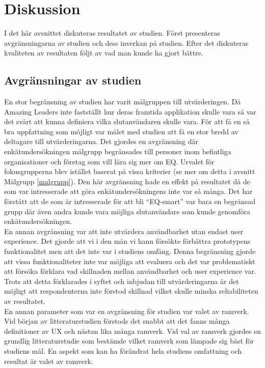 \section{Diskussion}
\label{sec:discussion}
I det här avsnittet diskuteras resultatet av studien. Först presenteras avgränsningarna av studien och dess inverkan på studien. Efter det diskuteras kvaliteten av resultaten följt av vad man kunde ha gjort bättre. 

\subsection{Avgränsningar av studien}
En stor begränsning av studien har varit målgruppen till utvärderingen. Då Amazing Leaders inte fastställt hur deras framtida applikation skulle vara så var det svårt att kunna definiera vilka slutanvändaren skulle vara. För att få en så bra uppfattning som möjligt var målet med studien att få en stor bredd av deltagare till utvärderingarna. Det gjordes en avgränsning där enkätundersökningen målgrupp begränsades till personer inom befintliga organisationer och företag som vill lära sig mer om EQ. Urvalet för fokusgrupperna blev istället baserat på vissa kriterier (se mer om detta i avsnitt Målgrupp \ref{malgrupp}). Den här avgränsning hade en effekt på resultatet då de som var intresserade att göra enkätundersökningens inte var så många. Det har förstått att de som är intresserade för att bli \enquote{EQ-smart} var bara en begränsad grupp där även andra kunde vara möjliga slutanvändare som kunde genomföra enkätundersökningen.
\\

En annan avgränsning var att inte utvärdera användbarhet utan endast user experience. Det gjorde att vi i den mån vi hann försökte förbättra prototypens funktionalitet men att det inte var i studiens omfång. Denna begränsning gjorde att vissa funktionaliteter inte var möjliga att evaluera och det var problematiskt att försöka förklara vad skillnaden mellan användbarhet och user experience var. Trots att detta förklarades i syftet och inbjudan till utvärderingarna är det möjligt att respondenterna inte förstod skillnad vilket skulle minska reliabiliteten av resultatet.
\\

En annan parameter som var en avgränsning för studien var valet av ramverk. Vid början av litteraturstudien förstods det snabbt att det fanns många definitioner av UX och nästan lika många ramverk. Vid val av ramverk gjordes en grundlig litteraturstudie som bestämde vilket ramverk som lämpade sig bäst för studiens mål. En aspekt som kan ha förändrat hela studiens omfattning och resultat är valet av ramverk.

